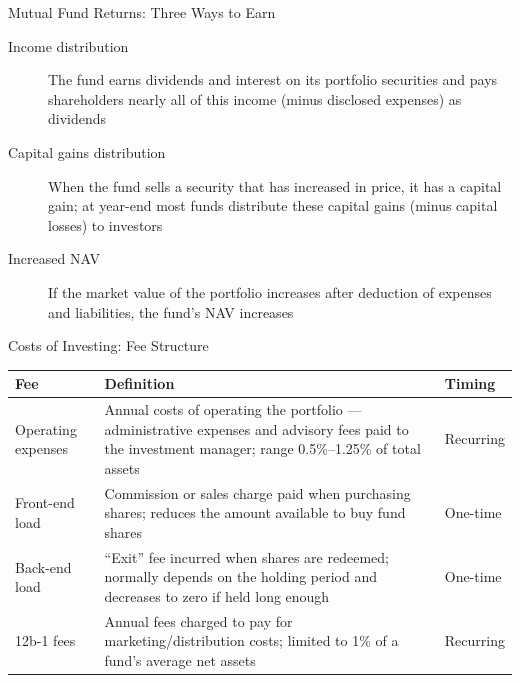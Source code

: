 \documentclass[aspectratio=169]{beamer}
\begin{document}
\begin{frame}{Mutual Fund Returns: Three Ways to Earn}
\begin{description}
  \item[Income distribution] The fund earns dividends and interest on its portfolio securities and pays shareholders nearly all of this income (minus disclosed expenses) as dividends
  \item[Capital gains distribution] When the fund sells a security that has increased in price, it has a capital gain; at year-end most funds distribute these capital gains (minus capital losses) to investors
  \item[Increased NAV] If the market value of the portfolio increases after deduction of expenses and liabilities, the fund's NAV increases
\end{description}
\end{frame}

\begin{frame}{Costs of Investing: Fee Structure}
\begin{table}
\centering
\small
\begin{tabular}{p{}p{}p{}}
\toprule
\textbf{Fee} & \textbf{Definition} & \textbf{Timing} \\
\midrule
Operating expenses & Annual costs of operating the portfolio --- administrative expenses and advisory fees paid to the investment manager; range 0.5\%--1.25\% of total assets & Recurring \\
Front-end load & Commission or sales charge paid when purchasing shares; reduces the amount available to buy fund shares & One-time \\
Back-end load & ``Exit'' fee incurred when shares are redeemed; normally depends on the holding period and decreases to zero if held long enough & One-time \\
12b-1 fees & Annual fees charged to pay for marketing/distribution costs; limited to 1\% of a fund's average net assets & Recurring \\
\bottomrule
\end{tabular}
\end{table}
\end{frame}
\end{document}

